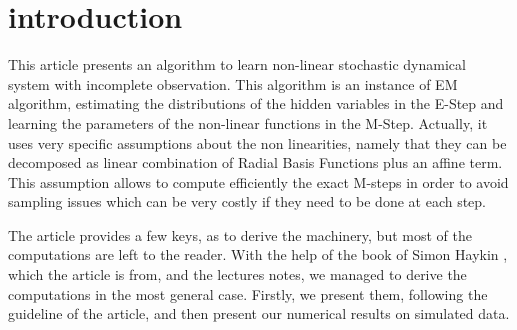 
\section*{introduction}
This article \cite{article} presents an algorithm to learn non-linear stochastic dynamical system with incomplete observation. This algorithm is an instance of EM algorithm, estimating the distributions of the hidden variables in the E-Step and learning the parameters of the non-linear functions in the M-Step. Actually, it uses very specific assumptions about the non linearities, namely that they can be decomposed as linear combination of Radial Basis Functions plus an affine term. This assumption allows to compute efficiently the exact M-steps in order to avoid sampling issues which can be very costly if they need to be done at each step.

The article provides a few keys, as to derive the machinery, but most of the computations are left to the reader. With the help of the book of Simon Haykin \cite{SimonHaykin}, which the article is from,  and the lectures notes, we managed to derive the computations in the most general case. Firstly, we present them, following the guideline of the article, and then present our numerical results on simulated data.





